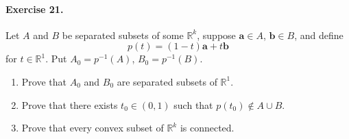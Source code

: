 \documentclass[11pt]{report}
\def\R{\mathbb{R}}
\renewcommand\vec\boldsymbol
\def\va{\vec{a}}
\def\vb{\vec{b}}
\theoremstyle{remark}
\begin{document}
    \paragraph{Exercise 21.} Let $A$ and $B$ be separated subsets of some $\R^k$,
    suppose $\va \in A$, $\vb \in B$, and define \[
        p(t) = (1 - t)\va + t\vb
    \] for $t \in \R^1$. Put $A_0 = p^{-1}(A)$, $B_0 = p^{-1}(B)$.
    \begin{enumerate}
        \itemsep0em
        \item Prove that $A_0$ and $B_0$ are separated subsets of $\R^1$.
        \item Prove that there exists $t_0 \in (0, 1)$ such that $p(t_0) \notin A
        \cup B$.
        \item Prove that every convex subset of $\R^k$ is connected.
    \end{enumerate}
\end{document}
